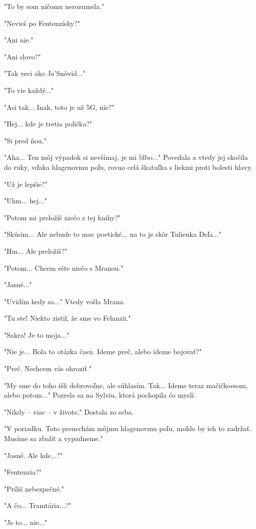 \documentclass{book}
\begin{document}
"$ $To by som ničomu nerozumela."$ $ 

"$ $Nevieš po Fentenzísky?"$ $ 

"$ $Ani nie."$ $ 

"$ $Ani slovo?"$ $ 

"$ $Tak veci ako Ja'Sno\v{}vid..."$ $ 

"$ $To vie každý..."$ $ 

"$ $Asi tak... Inak, toto je už 5G, nie?"$ $ 

"$ $Hej... kde je tretia polička?"$ $ 

"$ $Si pred ňou."$ $ 

"$ $Aha... Ten môj výpadok si nevšímaj, je mi blbo..."$ $  Povedala a vtedy jej skočila do ruky, vďaka hlagenovmu poľu, rovno celá škatuľka s liekmi proti bolesti hlavy.

"$ $Už je lepšie?"$ $ 

"$ $Uhm... hej..."$ $ 

"$ $Potom mi preložíš niečo z tej knihy?"$ $ 

"$ $Skúsim... Ale nebude to moc poetické... na to je skôr Tulienka Deľa..."$ $ 

"$ $Hm... Ale preložíš?"$ $ 

"$ $Potom... Chcem ešte niečo s Mranou."$ $ 

"$ $Jasné..."$ $ 

"$ $Uvidím kedy sa..."$ $  Vtedy vošla Mrana.

"$ $Tu ste! Niekto zistil, že sme vo Felanzii."$ $ 

"$ $Sakra! Je to moja..."$ $ 

"$ $Nie je... Bola to otázka času. Ideme preč, alebo ideme bojovať?"$ $ 

"$ $Preč. Nechcem vás ohroziť."$ $ 

"$ $My sme do toho išli dobrovoľne, ale súhlasím. Tak... Ideme teraz mačičkoesom, alebo potom..."$ $  Pozrela sa na Sylviu, ktorá pochopila čo myslí.

"$ $Nikdy – viac – v živote."$ $  Dostala zo seba.

"$ $V poriadku. Toto prenechám môjmu hlagenovmu poľu, mohlo by ich to zadržať. Musíme sa zbaliť a vypadneme."$ $ 

"$ $Jasné. Ale kde...?"$ $ 

"$ $Fentenzia?"$ $ 

"$ $Príliš nebezpečné."$ $ 

"$ $A čo... Tramtária...?"$ $ 

"$ $Je to... nie..."$ $ 
\end{document}
